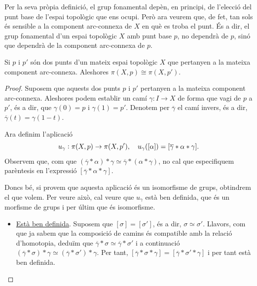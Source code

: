 \documentclass[../main.tex]{subfiles}
\begin{document}
Per la seva pròpia definició, el grup fonamental depèn, en principi, de l'elecció del punt base de l'espai topològic que ens ocupi. Però ara veurem que, de fet, tan sols és sensible a la component arc-connexa de $X$ en què es troba el punt. És a dir, el grup fonamental d'un espai topològic $X$ amb punt base $p$, no dependrà de $p$, sinó que dependrà de la component arc-connexa de $p$.

\begin{ter}
\label{ter:canvidepuntbase} Si $p$ i $p'$ són dos punts d'un mateix espai topològic $X$ que pertanyen a la mateixa component arc-connexa. Aleshores $\pi(X,p)\cong \pi(X,p')$.
\end{ter}
\begin{proof}
Suposem que aquests dos punts $p$ i $p'$ pertanyen a la mateixa component arc-connexa. Aleshores podem establir un camí $\gamma:I\rightarrow X$ de forma que vagi de $p$ a $p'$, és a dir, que $\gamma(0) = p$ i $\gamma(1) =p'$. Denotem per $\overline{\gamma}$ el camí invers, és a dir, $\overline{\gamma}(t) = \gamma(1-t)$.

Ara definim l'aplicació
\begin{equation}
    \notag
    u_\gamma:\pi(X,p)\rightarrow \pi(X,p'),\quad u_\gamma([\alpha]) = [\overline{\gamma}*\alpha*\gamma].
\end{equation}
Observem que, com que $(\overline{\gamma}*\alpha)*\gamma\simeq\overline{\gamma}*(\alpha*\gamma)$, no cal que especifiquem parèntesis en l'expressió $[\overline{\gamma}*\alpha*\gamma]$.

Doncs bé, si provem que aquesta aplicació és un isomorfisme de grups, obtindrem el que volem. Per veure això, cal veure que $u_\gamma$ està ben definida, que és un morfisme de grups i per últim que és isomorfisme.
\begin{itemize}
    \item \underline{Està ben definida}. Suposem que $[\sigma]=[\sigma']$, és a dir, $\sigma\simeq\sigma'$. Llavors, com que ja sabem que la composició de camins és compatible amb la relació d'homotopia, deduïm que $\overline{\gamma}*\sigma\simeq\overline{\gamma}*\sigma'$ i a continuació $(\overline{\gamma}*\sigma)*\gamma\simeq(\overline{\gamma}*\sigma')*\gamma$. Per tant, $[\overline{\gamma}*\sigma*\gamma]=[\overline{\gamma}*\sigma'*\gamma]$ i per tant està ben definida.
    

\end{itemize}
\end{proof}
\end{document}

